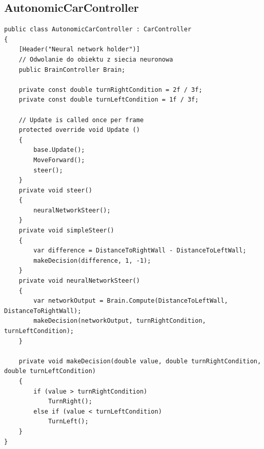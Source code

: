 \documentclass[12pt,a4paper]{article}
\begin{document}
	\subsection{AutonomicCarController}
	\begin{lstlisting}
public class AutonomicCarController : CarController
{
    [Header("Neural network holder")]
    // Odwolanie do obiektu z siecia neuronowa
    public BrainController Brain;

    private const double turnRightCondition = 2f / 3f;
    private const double turnLeftCondition = 1f / 3f;

    // Update is called once per frame
    protected override void Update ()
    {
        base.Update();
        MoveForward();
        steer();
	}
    private void steer()
    {
        neuralNetworkSteer();
    }
    private void simpleSteer()
    {
        var difference = DistanceToRightWall - DistanceToLeftWall;
        makeDecision(difference, 1, -1);
    }
    private void neuralNetworkSteer()
    {
        var networkOutput = Brain.Compute(DistanceToLeftWall, DistanceToRightWall);
        makeDecision(networkOutput, turnRightCondition, turnLeftCondition);
    }

    private void makeDecision(double value, double turnRightCondition, double turnLeftCondition)
    {
        if (value > turnRightCondition)
            TurnRight();
        else if (value < turnLeftCondition)
            TurnLeft();
    }
}
	\end{lstlisting}
	\clearpage
\end{document}
